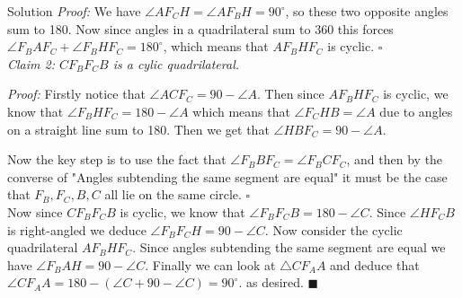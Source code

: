\documentclass{article}
\begin{document}
\begin{solution}{Solution}
\textit{Proof:} We have $\angle AF_C H = \angle AF_B H = 90^\circ$, so
these two opposite angles sum to 180. Now since angles in a quadrilateral
sum to 360 this forces $\angle F_B A F_C + \angle F_B H F_C = 180^\circ$,
which means that $A F_B H F_C$ is cyclic. $\square$ \\

\textit{Claim 2: $C F_B F_C B$ is a cylic quadrilateral.}
\vspace{0.2cm}

\textit{Proof:} Firstly notice that $\angle ACF_C = 90 - \angle A$.
Then since $A F_B H F_C$ is cyclic, we know that
$\angle F_B H F_C = 180 - \angle A$ which means that
$\angle F_C H B = \angle A$ due to angles on a straight line sum to 180.
Then we get that $\angle H B F_C = 90 - \angle A$. \vspace{0.2cm}

Now the key step is to use the fact that $\angle F_B B F_C = \angle
F_B C F_C$, and then by the converse of "Angles subtending the same segment
are equal" it must be the case that $F_B, F_C, B, C$ all lie on the same
circle. $\square$ \\

Now since $C F_B F_C B$ is cyclic, we know that
$\angle F_B F_C B = 180 - \angle C$. Since $\angle HF_CB$ is right-angled
we deduce $\angle F_B F_C H = 90 - \angle C$. Now consider the cyclic
quadrilateral $A F_B H F_C$.
Since angles subtending
the same segment are equal we have $\angle F_B A H = 90 - \angle C$.
Finally we can look at $\triangle C F_A A$ and deduce that
$\angle C F_A A = 180 - (\angle C + 90 - \angle C) = 90^\circ$.
as desired. $\blacksquare$
\end{solution}
\newpage
\end{document}
